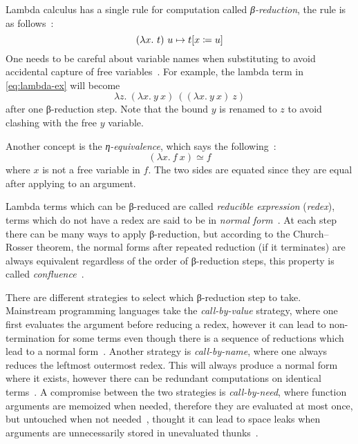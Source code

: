 Lambda calculus has a single rule for computation called \emph{β-reduction}, the
rule is as follows~\cite{functional-Hudak, lambda-Hindley}:
\begin{equation}
  (\lambda x.\ t)\ u \mapsto t[x \coloneqq u]
  \label{eq:beta}
\end{equation}
One needs to be careful about variable names when substituting to avoid
accidental capture of free variables~\cite{functional-Hudak, lambda-Barendregt}.
For example, the lambda term in \cref{eq:lambda-ex} will become
\begin{equation}
  \lambda z.\ (\lambda x.\ y\ x)\ ((\lambda x.\ y\ x)\ z)
  \label{eq:lambda-ex-beta}
\end{equation}
after one β-reduction step. Note that the bound \(y\) is renamed to \(z\) to
avoid clashing with the free \(y\) variable.

Another concept is the \emph{η-equivalence}, which says the
following~\cite{functional-Hudak, lambda-Barendregt}:
\begin{equation}
  (\lambda x.\ f\ x) \simeq f
\end{equation}
where \(x\) is not a free variable in \(f\). The two sides are equated since
they are equal after applying to an argument.

Lambda terms which can be β-reduced are called \emph{reducible expression}
(\emph{redex}), terms which do not have a redex are said to be in \emph{normal
  form}~\cite{functional-Barendregt, lambda-Revesz, lambda-Hindley}. At each step
there can be many ways to apply β-reduction, but according to the
Church{--}Rosser theorem, the normal forms after repeated reduction (if it
terminates) are always equivalent regardless of the order of β-reduction steps,
this property is called \emph{confluence}~\cite{lambda-Revesz, lambda-Hindley,
  churchrosser}.

There are different strategies to select which β-reduction step to take.
Mainstream programming languages take the \emph{call-by-value} strategy, where
one first evaluates the argument before reducing a redex, however it can lead to
non-termination for some terms even though there is a sequence of reductions
which lead to a normal form~\cite{sicp, lambda-Sestoft, type-Pierce}. Another
strategy is \emph{call-by-name}, where one always reduces the leftmost outermost
redex. This will always produce a normal form where it exists, however there can
be redundant computations on identical terms~\cite{sicp, lambda-Sestoft}. A
compromise between the two strategies is \emph{call-by-need}, where function
arguments are memoized when needed, therefore they are evaluated at most once,
but untouched when not needed~\cite{functional-Hudak, callbyneed}, thought it
can lead to space leaks when arguments are unnecessarily stored in unevaluated
thunks~\cite{spaceleak}.

